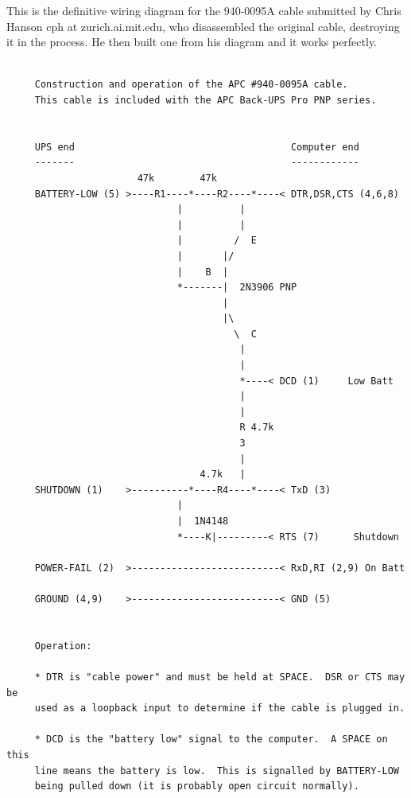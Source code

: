 {{{{{{{{{{\label{index-Cables-206}
This is the definitive wiring diagram for the 940-0095A cable submitted by
Chris Hanson \lt{}cph at zurich.ai.mit.edu\gt{}, who disassembled the original
cable, destroying it in the process. He then built one from his diagram and it
works perfectly. 

\footnotesize
\begin{verbatim}
     
     Construction and operation of the APC #940-0095A cable.
     This cable is included with the APC Back-UPS Pro PNP series.
     
     
     UPS end                                      Computer end
     -------                                      ------------
                       47k        47k
     BATTERY-LOW (5) >----R1----*----R2----*----< DTR,DSR,CTS (4,6,8)
                              |          |
                              |          |
                              |         /  E
                              |       |/
                              |    B  |
                              *-------|  2N3906 PNP
                                      |
                                      |\
                                        \  C
                                         |
                                         |
                                         *----< DCD (1)     Low Batt
                                         |
                                         |
                                         R 4.7k
                                         3
                                         |
                                  4.7k   |
     SHUTDOWN (1)    >----------*----R4----*----< TxD (3)
                              |
                              |  1N4148
                              *----K|---------< RTS (7)      Shutdown
     
     POWER-FAIL (2)  >--------------------------< RxD,RI (2,9) On Batt
     
     GROUND (4,9)    >--------------------------< GND (5)
     
     
     Operation:
     
     * DTR is "cable power" and must be held at SPACE.  DSR or CTS may be
     used as a loopback input to determine if the cable is plugged in.
     
     * DCD is the "battery low" signal to the computer.  A SPACE on this
     line means the battery is low.  This is signalled by BATTERY-LOW
     being pulled down (it is probably open circuit normally).
     

\end{verbatim}}}}}}}}}}}
